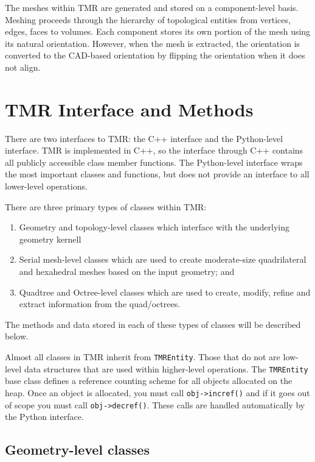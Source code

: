 \documentclass[12pt]{article}
\begin{document}
The meshes within TMR are generated and stored on a component-level basis.
Meshing proceeds through the hierarchy of topological entities from vertices, edges, faces to volumes.
Each component stores its own portion of the mesh using its natural orientation.
However, when the mesh is extracted, the orientation is converted to the CAD-based orientation by flipping the orientation when it does not align. 

\section{TMR Interface and Methods}

There are two interfaces to TMR: the C++ interface and the Python-level interface. 
TMR is implemented in C++, so the interface through C++ contains all publicly accessible class member functions.
The Python-level interface wraps the most important classes and functions, but does not provide an interface to all lower-level operations.

There are three primary types of classes within TMR:
\begin{enumerate}
\item Geometry and topology-level classes which interface with the underlying geometry kernell
\item Serial mesh-level classes which are used to create moderate-size quadrilateral and hexahedral meshes based on the input geometry; and
\item Quadtree and Octree-level classes which are used to create, modify, refine and extract information from the quad/octrees.
\end{enumerate}
%
The methods and data stored in each of these types of classes will be described below.

Almost all classes in TMR inherit from \texttt{TMREntity}. 
Those that do not are low-level data structures that are used within higher-level operations.
The \texttt{TMREntity} base class defines a reference counting scheme for all objects allocated on the heap. 
Once an object is allocated, you must call \texttt{obj->incref()} and if it goes out of scope you must call \texttt{obj->decref()}.
These calls are handled automatically by the Python interface.

\subsection{Geometry-level classes}
\end{document}
